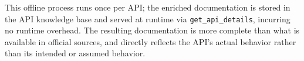 
This offline process runs once per API; the enriched documentation is stored in the API knowledge base and served at runtime via \texttt{get\_api\_details}, incurring no runtime overhead. The resulting documentation is more complete than what is available in official sources, and directly reflects the API's actual behavior rather than its intended or assumed behavior.


